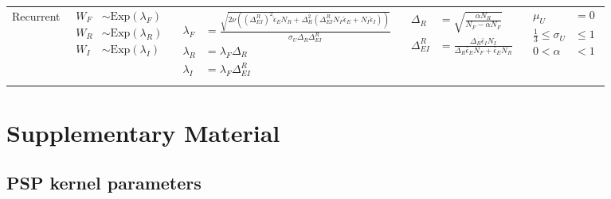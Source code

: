 \documentclass[11pt,a4paper]{article}
\begin{document}
\begin{refsection}
\begin{sidewaystable}[htpb]
\begin{tabularx}{\textheight}{@{\extracolsep{\fill}}lllll}
\addlinespace
\midrule
\addlinespace
Recurrent
& $\begin{aligned}
        W_F &\sim \mathrm{Exp}\left(\lambda_F\right)\\
        W_R &\sim \mathrm{Exp}\left(\lambda_R\right)\\
        W_I &\sim \mathrm{Exp}\left(\lambda_I\right)
   \end{aligned}$
& $\begin{aligned} 
            \lambda_F &=  \frac{ \sqrt{2 \nu \left((\Delta_{EI}^{R})^2 \hat\epsilon_E N_R + \Delta_R^2\left(\Delta_{EI}^R N_F \hat\epsilon_E + N_I \hat\epsilon_I \right) \right)} }{ \sigma_U \Delta_{R} \Delta_{EI}^R}\\ 
           \lambda_R &= \lambda_F\Delta_R \\
           \lambda_I &= \lambda_F \Delta_{EI}^R
    \end{aligned}$
& $ \begin{aligned}
    \Delta_{R} &= \sqrt{ \frac{\alpha N_R}{N_F - \alpha N_F} }\\
    \Delta_{EI}^R &= \frac{ \Delta_R \bar\epsilon_I N_I }{\Delta_R \bar\epsilon_E N_F + \bar\epsilon_E N_R}
\end{aligned}$
& $\begin{aligned}
    \mu_U&=0\\ 
    \frac{1}{3}\le\sigma_U&\le 1\\ 
    0<\alpha&<1
\end{aligned}$
\\
\addlinespace
\bottomrule
\end{tabularx}
\label{stab:dalian_init}
\end{sidewaystable}
 
\clearpage
\section*{Supplementary Material}



\subsection{PSP kernel parameters} 
\label{sup:kernel}


\end{refsection}
\end{document}
